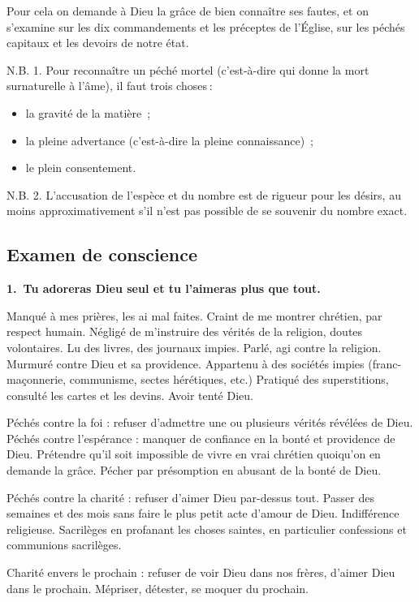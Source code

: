 \documentclass[%
a5paper%
,11pt%
,DIV=15%
,titlepage=on%
,headings=optiontoheadandtoc%
,headings=small%
,parskip=false%
,titlepage%
,openany%
]{scrbook}
\newcommand{\commandement}[1]{\noindent\textbf{#1}}
\begin{document}
Pour cela on demande à Dieu la grâce de bien connaître ses fautes, et on s’examine sur les dix commandements et les préceptes de l’Église, sur les péchés capitaux et les devoirs de notre état.

N.B. 1. Pour reconnaître un péché mortel (c’est-à-dire qui donne la mort surnaturelle à l’âme), il faut trois choses :
\begin{itemize}
\item la gravité de la matière ;
\item la pleine advertance (c’est-à-dire la pleine connaissance) ;
\item le plein consentement.
\end{itemize}

N.B. 2. L’accusation de l’espèce et du nombre est de rigueur pour les désirs, au moins approximativement s'il n'est pas possible de se souvenir du nombre exact.


\subsection*{Examen de conscience}


\commandement{1. Tu adoreras Dieu seul et tu l'aimeras plus que tout.}

Manqué à mes prières, les ai mal faites.
Craint de me montrer chrétien, par respect humain. Négligé de m’instruire des
vérités de la religion, doutes volontaires.
Lu des livres, des journaux impies. Parlé,
agi contre la religion. Murmuré contre
Dieu et sa providence. Appartenu à des
sociétés impies (franc-maçonnerie, communisme, sectes hérétiques, etc.) Pratiqué
des superstitions, consulté les cartes et les
devins. Avoir tenté Dieu.

Péchés contre la foi : refuser d’admettre
une ou plusieurs vérités révélées de Dieu.
Péchés contre l’espérance : manquer de
confiance en la bonté et providence de
Dieu. Prétendre qu’il soit impossible de
vivre en vrai chrétien quoiqu’on en demande la grâce. Pécher par présomption
en abusant de la bonté de Dieu.

Péchés contre la charité : refuser d’aimer
Dieu par-dessus tout. Passer des semaines
et des mois sans faire le plus petit acte
d’amour de Dieu. Indifférence religieuse.
Sacrilèges en profanant les choses saintes,
en particulier confessions et communions
sacrilèges.

Charité envers le prochain : refuser de
voir Dieu dans nos frères, d’aimer Dieu
dans le prochain. Mépriser, détester, se
moquer du prochain.
\end{document}
